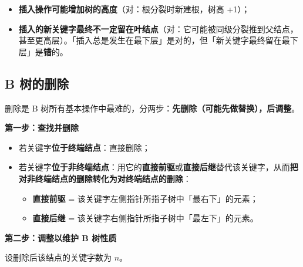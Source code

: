 \documentclass[11pt,openany,UTF8]{ctexbook}
\begin{document}
\begin{itemize}
\item \textbf{插入操作可能增加树的高度}（对：根分裂时新建根，树高 +1）；
\item \textbf{插入的新关键字最终不一定留在叶结点}（对：它可能被同级分裂推到父结点，甚至更高层）。「插入总是发生在最下层」是对的，但「新关键字最终留在最下层」是\textbf{错}的。
\end{itemize}
\subsection{B 树的删除}

删除是 B 树所有基本操作中最难的，分两步：\textbf{先删除（可能先做替换），后调整}。

\textbf{第一步：查找并删除}

\begin{itemize}
\item 若关键字\textbf{位于终端结点}：直接删除；
\item 若关键字\textbf{位于非终端结点}：用它的\textbf{直接前驱}或\textbf{直接后继}替代该关键字，从而\textbf{把对非终端结点的删除转化为对终端结点的删除}：
\begin{itemize}
\item \textbf{直接前驱} = 该关键字左侧指针所指子树中「最右下」的元素；
\item \textbf{直接后继} = 该关键字右侧指针所指子树中「最左下」的元素。
\end{itemize}
\end{itemize}
\textbf{第二步：调整以维护 B 树性质}

设删除后该结点的关键字数为 $n$。
\end{document}
